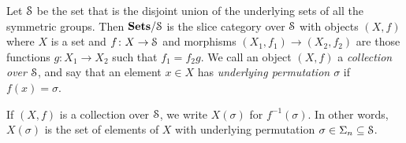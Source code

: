 \begin{Defi}\label{Defi:coll-over-SS}
  Let $\mathcal{S}$ be the set that is the disjoint union of the underlying sets of all the symmetric groups. Then $\mathbf{Sets}/\mathcal{S}$ is the slice category over $\mathcal{S}$ with objects $(X,f)$ where $X$ is a set and $f \colon X \rightarrow \mathcal{S}$ and morphisms $(X_{1}, f_{1}) \rightarrow (X_{2}, f_{2})$ are those functions $g \colon X_{1} \rightarrow X_{2}$ such that $f_{1} = f_{2}g$. We call an object $(X,f)$ a \textit{collection over $\mathcal{S}$}, and say that an element $x \in X$ has \emph{underlying permutation $\sigma$} if $f(x) = \sigma$.
\end{Defi}

\begin{nota}\label{nota:Xofsigma}
If $(X, f)$ is a collection over $\mathcal{S}$, we write $X(\sigma)$ for $f^{-1}(\sigma)$. In other words, $X(\sigma)$ is the set of elements of $X$ with underlying permutation $\sigma \in \Sigma_n \subseteq \mathcal{S}$.
\end{nota}

